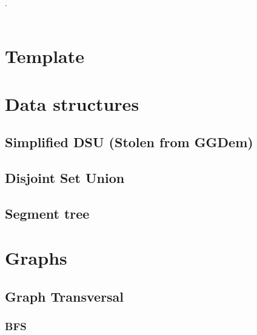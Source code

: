 

\def\title{Universidad Autonoma de Ciudad Juarez - First to Penalty}
.\\[0.2cm]
 \\[0.5cm]
\tableofcontents\newpage

\section{Template}
\section{Data structures}
\subsection{Simplified DSU (Stolen from GGDem)}
\subsection{Disjoint Set Union}
\subsection{Segment tree}


\section{Graphs}
\subsection{Graph Transversal}
\subsubsection{BFS}
